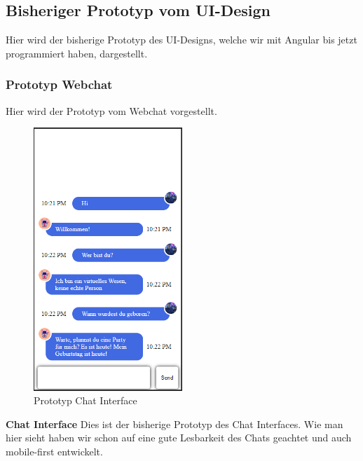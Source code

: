 \newpage

\subsection{Bisheriger Prototyp vom UI-Design}
Hier wird der bisherige Prototyp des UI-Designs, 
welche wir mit Angular bis jetzt programmiert haben, dargestellt.

\subsubsection{Prototyp Webchat}
Hier wird der Prototyp vom Webchat vorgestellt.

\begin{figure}[H]
    \centering
    \includegraphics[width=0.5\textwidth]{bilder/prototyp UI Design/Chatinterface mobil.png}
    \caption{Prototyp Chat Interface}
    \label{fig:Prototyp Chat Interface}
\end{figure}
\noindent \textbf{Chat Interface} \newline
Dies ist der bisherige Prototyp des Chat Interfaces. Wie man hier sieht haben wir schon auf eine 
gute Lesbarkeit des Chats geachtet und auch mobile-first entwickelt.

